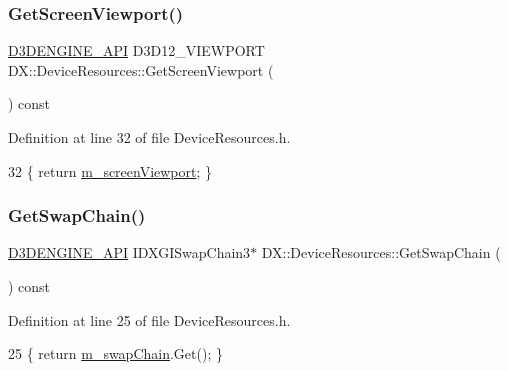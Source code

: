 \subsubsection{\texorpdfstring{Get\+Screen\+Viewport()}{GetScreenViewport()}}
{\footnotesize\ttfamily \mbox{\hyperlink{stdafx_8h_a8ee2d990c5dfba7794dd2b60741d7722}{D3\+D\+E\+N\+G\+I\+N\+E\+\_\+\+A\+PI}} D3\+D12\+\_\+\+V\+I\+E\+W\+P\+O\+RT D\+X\+::\+Device\+Resources\+::\+Get\+Screen\+Viewport (\begin{DoxyParamCaption}{ }\end{DoxyParamCaption}) const\hspace{0.3cm}{\ttfamily [inline]}}



Definition at line 32 of file Device\+Resources.\+h.


\begin{DoxyCode}
32 \{ \textcolor{keywordflow}{return} \mbox{\hyperlink{class_d_x_1_1_device_resources_a0118fbbdb43755f01b25ed6d2e9893fc}{m\_screenViewport}}; \}
\end{DoxyCode}
\mbox{\label{class_d_x_1_1_device_resources_a7a96c1ac092f671997e17f9078c409e3}} 
\subsubsection{\texorpdfstring{Get\+Swap\+Chain()}{GetSwapChain()}}
{\footnotesize\ttfamily \mbox{\hyperlink{stdafx_8h_a8ee2d990c5dfba7794dd2b60741d7722}{D3\+D\+E\+N\+G\+I\+N\+E\+\_\+\+A\+PI}} I\+D\+X\+G\+I\+Swap\+Chain3$\ast$ D\+X\+::\+Device\+Resources\+::\+Get\+Swap\+Chain (\begin{DoxyParamCaption}{ }\end{DoxyParamCaption}) const\hspace{0.3cm}{\ttfamily [inline]}}



Definition at line 25 of file Device\+Resources.\+h.


\begin{DoxyCode}
25 \{ \textcolor{keywordflow}{return} \mbox{\hyperlink{class_d_x_1_1_device_resources_a8f067c81561cd51ac8e59a89e868571b}{m\_swapChain}}.Get(); \}
\end{DoxyCode}
\mbox{\label{class_d_x_1_1_device_resources_ac6034a7660faea0d269dbb0d325cb7cd}} 
